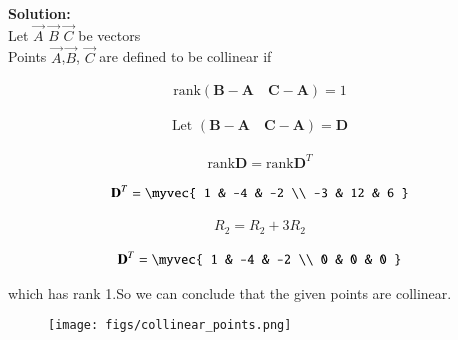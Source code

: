 \documentclass[journal]{IEEEtran}
\begin{document}
\textbf{Solution:}\\
Let $\vec{A}$   $\vec{B}$    $\vec{C}$ be vectors \\
Points $\vec{A}$,$\vec{B}$, $\vec{C}$ are defined to be collinear if\\
\begin{center}
  
        
    
  \begin{align}
\text{rank}\left(\textbf{B} - \textbf{A} \quad \textbf{C} - \textbf{A}\right) = 1
\end{align}

\begin{align}
    \text{Let }\left(\textbf{B} - \textbf{A} \quad \textbf{C} - \textbf{A}\right) = \textbf{D} 
\end{align}

 

\begin{align}
    \text{rank} \textbf{D} = \text{rank} \textbf{D}^{T}
\end{align}


\vspace{0.5cm}
\begin{align}
    \textbf{D}^{T}=\myvec{
1 & -4 & -2 \\
-3 & 12 & 6
}
\end{align}

\vspace{0.4cm}

\begin{align}
    R_{2} = R_{2} + 3R_{2}
\end{align}


\vspace{0.4cm}

\begin{align}
    \textbf{D}^{T}=\myvec{
1 & -4 & -2 \\
0 & 0 & 0
}
\end{align}


\vspace{0.4cm}
 which has rank 1.So we can conclude that the given points are collinear.

\end{center}





\begin{figure}{}
    \centering
    \texttt{[image: figs/collinear\_points.png]}
    \caption{}
    \label{fig:placeholder}
\end{figure}
\end{document}
